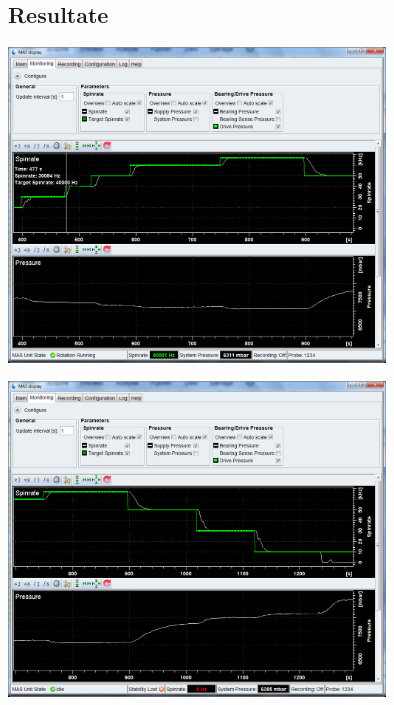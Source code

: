 \documentclass[a4paper]{article}
\newenvironment{Figure}
	{\par\medskip\noindent\minipage{\linewidth}}
	{\endminipage\par\medskip}
\begin{document}
	\subsection{Resultate}
	
	\begin{Figure}
		\centering
		\includegraphics[width=10cm]{images/gruppe1_auf.png}
		\label{fig:topspin_up}
	\end{Figure}
	
	\begin{flushleft}
		\begin{Figure}
			\centering
			\includegraphics[width=10cm]{images/gruppe1_ab.png}
			\label{fig:topspin_down}
		\end{Figure}
	\end{flushleft}
	\pagebreak
	
\end{document}
